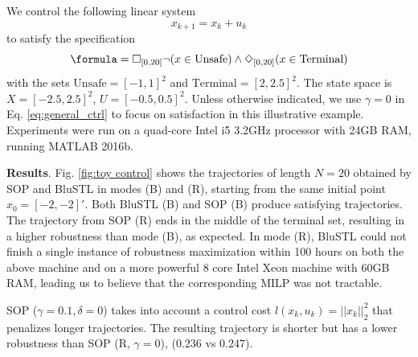 \begin{exmp}
\label{ex:toyproblem}
We control the following linear system
\begin{equation}
\label{eq:PointMass}
x_{k+1} = x_k + u_k
\end{equation}
to satisfy the specification
\[\formula = \always_{[0,20]} \neg (x \in \text{Unsafe}) \land \eventually_{[0,20]} (x \in \text{Terminal})\]
with the sets $\text{Unsafe}=[-1,1]^2$ and $\text{Terminal}=[2,2.5]^2$. 
The state space is $X=[-2.5,2.5]^2$, $U=[-0.5,0.5]^2$.
Unless otherwise indicated, we use $\gamma=0$ in Eq. \ref{eq:general_ctrl} to focus on satisfaction in this illustrative example. 
Experiments were run on a quad-core Intel i5 3.2GHz processor with 24GB RAM, running MATLAB 2016b.

\textbf{Results}.
Fig. \ref{fig:toy control} shows the trajectories of length $N=20$ obtained by SOP and BluSTL in modes (B) and (R), starting from the same initial point $x_0=[-2,-2]'$.
Both BluSTL (B) and SOP (B) produce satisfying trajectories. 
The trajectory from SOP (R) ends in the middle of the terminal set, resulting in a higher robustness than mode (B), as expected. 
In mode (R), BluSTL could not finish a single instance of robustness maximization within 100 hours on both the above machine and on a more powerful 8 core Intel Xeon machine with 60GB RAM, leading us to believe that the corresponding MILP was not tractable.
 
SOP ($\gamma=0.1,\delta=0$) takes into account a control cost $l(x_k,u_k) = ||x_k||_{2}^2$ that penalizes longer trajectories.
The resulting trajectory is shorter but has a lower robustness than SOP (R, $\gamma = 0$), ($0.236$ vs $0.247$).


\end{exmp}
